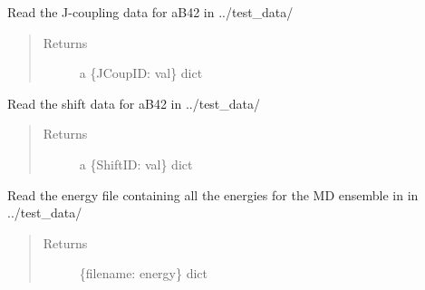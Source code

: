 \documentclass[letterpaper,10pt,english]{sphinxmanual}
\begin{document}

\begin{fulllineitems}
\label{modules:readutil.get_ab42_jcoup_data}
Read the J-coupling data for aB42 in ../test\_data/
\begin{quote}\begin{description}
\item[{Returns}] \leavevmode
a \{JCoupID: val\} dict

\end{description}\end{quote}

\end{fulllineitems}


\begin{fulllineitems}
\label{modules:readutil.get_ab42_shift_data}
Read the shift data for aB42 in ../test\_data/
\begin{quote}\begin{description}
\item[{Returns}] \leavevmode
a \{ShiftID: val\} dict

\end{description}\end{quote}

\end{fulllineitems}


\begin{fulllineitems}
\label{modules:readutil.get_md_energies}
Read the energy file containing all the energies for the
MD ensemble in in ../test\_data/
\begin{quote}\begin{description}
\item[{Returns}] \leavevmode
\{filename: energy\} dict

\end{description}\end{quote}

\end{fulllineitems}

\end{document}

